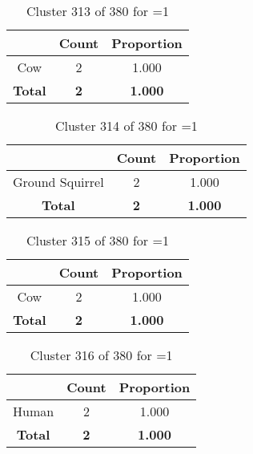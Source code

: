 \begin{table}[ht!]
\centering
\begin{tabular}{|c|c|c|}
\hline
\bf \Spec{} &\bf Count &\bf Proportion\\ \hline \hline
Cow & 2 & 1.000\\ \hline
\hline
\bf Total & \bf 2 & \bf 1.000\\ \hline
\end{tabular}
\label{tab:cluster:313:1}
\caption{Cluster 313 of 380 for \minneigh{}=1}
\end{table}

\begin{table}[ht!]
\centering
\begin{tabular}{|c|c|c|}
\hline
\bf \Spec{} &\bf Count &\bf Proportion\\ \hline \hline
Ground Squirrel & 2 & 1.000\\ \hline
\hline
\bf Total & \bf 2 & \bf 1.000\\ \hline
\end{tabular}
\label{tab:cluster:314:1}
\caption{Cluster 314 of 380 for \minneigh{}=1}
\end{table}

\begin{table}[ht!]
\centering
\begin{tabular}{|c|c|c|}
\hline
\bf \Spec{} &\bf Count &\bf Proportion\\ \hline \hline
Cow & 2 & 1.000\\ \hline
\hline
\bf Total & \bf 2 & \bf 1.000\\ \hline
\end{tabular}
\label{tab:cluster:315:1}
\caption{Cluster 315 of 380 for \minneigh{}=1}
\end{table}

\begin{table}[ht!]
\centering
\begin{tabular}{|c|c|c|}
\hline
\bf \Spec{} &\bf Count &\bf Proportion\\ \hline \hline
Human & 2 & 1.000\\ \hline
\hline
\bf Total & \bf 2 & \bf 1.000\\ \hline
\end{tabular}
\label{tab:cluster:316:1}
\caption{Cluster 316 of 380 for \minneigh{}=1}
\end{table}

